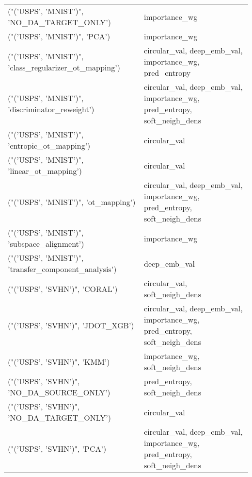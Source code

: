 \begin{tabular}{ll}
 ("('USPS', 'MNIST')", 'NO\_DA\_TARGET\_ONLY')            & importance\_wg                                                            \\
 ("('USPS', 'MNIST')", 'PCA')                          & importance\_wg                                                            \\
 ("('USPS', 'MNIST')", 'class\_regularizer\_ot\_mapping') & circular\_val, deep\_emb\_val, importance\_wg, pred\_entropy                  \\
 ("('USPS', 'MNIST')", 'discriminator\_reweight')       & circular\_val, deep\_emb\_val, importance\_wg, pred\_entropy, soft\_neigh\_dens \\
 ("('USPS', 'MNIST')", 'entropic\_ot\_mapping')          & circular\_val                                                             \\
 ("('USPS', 'MNIST')", 'linear\_ot\_mapping')            & circular\_val                                                             \\
 ("('USPS', 'MNIST')", 'ot\_mapping')                   & circular\_val, deep\_emb\_val, importance\_wg, pred\_entropy, soft\_neigh\_dens \\
 ("('USPS', 'MNIST')", 'subspace\_alignment')           & importance\_wg                                                            \\
 ("('USPS', 'MNIST')", 'transfer\_component\_analysis')  & deep\_emb\_val                                                             \\
 ("('USPS', 'SVHN')", 'CORAL')                         & circular\_val, soft\_neigh\_dens                                            \\
 ("('USPS', 'SVHN')", 'JDOT\_XGB')                      & circular\_val, deep\_emb\_val, importance\_wg, pred\_entropy, soft\_neigh\_dens \\
 ("('USPS', 'SVHN')", 'KMM')                           & importance\_wg, soft\_neigh\_dens                                           \\
 ("('USPS', 'SVHN')", 'NO\_DA\_SOURCE\_ONLY')             & pred\_entropy, soft\_neigh\_dens                                            \\
 ("('USPS', 'SVHN')", 'NO\_DA\_TARGET\_ONLY')             & circular\_val                                                             \\
 ("('USPS', 'SVHN')", 'PCA')                           & circular\_val, deep\_emb\_val, importance\_wg, pred\_entropy, soft\_neigh\_dens \\

\end{tabular}
